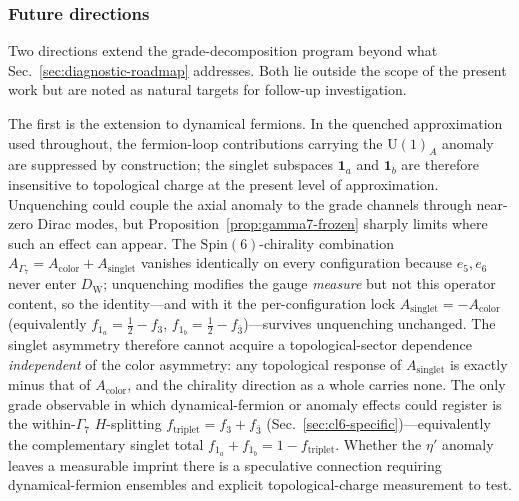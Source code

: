 \documentclass[12pt]{article}
\theoremstyle{definition}
\theoremstyle{remark}
\newcommand{\spin}{\mathrm{Spin}}       %
\newcommand{\dW}{D_{\mathrm{W}}}        %
\newcommand{\half}{\tfrac{1}{2}}
\newcommand{\GaSeven}{\Gamma_7}                      %
\newcommand{\ftriplet}{f_{\mathrm{triplet}}}          %
\begin{document}
	\subsubsection{Future directions}
	\label{sec:future-directions}
	
	Two directions extend the grade-decomposition program beyond what
	Sec.~\ref{sec:diagnostic-roadmap} addresses.  Both lie outside the scope of
	the present work but are noted as natural targets for follow-up investigation.
	
	The first is the extension to dynamical fermions.  In the quenched
	approximation used throughout, the fermion-loop contributions carrying the
	$\mathrm{U}(1)_A$ anomaly are suppressed by construction; the singlet
	subspaces $\mathbf{1}_a$ and $\mathbf{1}_b$ are therefore insensitive to
	topological charge at the present level of approximation.  Unquenching could couple the axial anomaly to the grade channels through
	near-zero Dirac modes, but Proposition~\ref{prop:gamma7-frozen} sharply
	limits where such an effect can appear.  The $\spin(6)$-chirality combination
	$A_{\GaSeven} = A_{\mathrm{color}} + A_{\mathrm{singlet}}$ vanishes identically
	on every configuration because $e_5,e_6$ never enter $\dW$; unquenching
	modifies the gauge \emph{measure} but not this operator content, so the
	identity---and with it the per-configuration lock
	$A_{\mathrm{singlet}} = -A_{\mathrm{color}}$ (equivalently $f_{1_a}=\half-f_3$,
	$f_{1_b}=\half-f_{\bar 3}$)---survives unquenching unchanged.  The singlet
	asymmetry therefore cannot acquire a topological-sector dependence
	\emph{independent} of the color asymmetry: any topological response of
	$A_{\mathrm{singlet}}$ is exactly minus that of $A_{\mathrm{color}}$, and the
	chirality direction as a whole carries none.  The only grade observable in
	which dynamical-fermion or anomaly effects could register is the
	within-$\GaSeven$ $H$-splitting $\ftriplet = f_3 + f_{\bar 3}$
	(Sec.~\ref{sec:cl6-specific})---equivalently the complementary singlet total
	$f_{1_a}+f_{1_b}=1-\ftriplet$.  Whether the $\eta'$ anomaly leaves a measurable
	imprint there is a speculative connection requiring dynamical-fermion ensembles
	and explicit topological-charge measurement to test.
	
\end{document}
